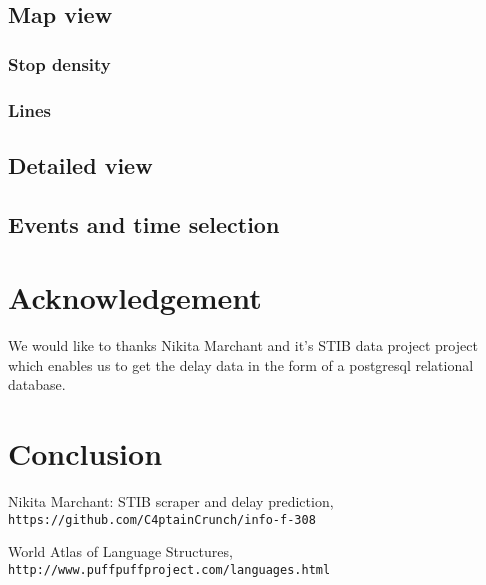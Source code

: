 \documentclass[12pt]{article}%
\begin{document}
\subsection{Map view}

\subsubsection{Stop density}


\subsubsection{Lines}

\subsection{Detailed view}






\subsection{Events and time selection}

\section{Acknowledgement}

We would like to thanks Nikita Marchant and it's STIB data project \cite{nikita} project which enables us to get the delay data in the form of a postgresql relational database.

\section{Conclusion}


 
\begin{thebibliography}{9}
 
Nikita Marchant: STIB scraper and delay prediction,
\\\texttt{https://github.com/C4ptainCrunch/info-f-308}

World Atlas of Language Structures,
\\\texttt{http://www.puffpuffproject.com/languages.html}



\end{thebibliography}
\end{document}
